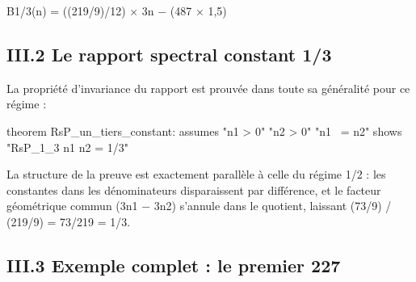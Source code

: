 \documentclass[11pt,a4paper]{article}
\begin{document}
B1/3(n) = ((219/9)/12) × 3n − (487 × 1,5)

\subsection{III.2 Le rapport spectral constant 1/3}

La propriété d'invariance du rapport est prouvée dans toute sa généralité pour ce régime :

\begin{holcode}[title={Code HOL — Théorème RsP = 1/3}]
theorem RsP_un_tiers_constant:
 assumes "n1 > 0" "n2 > 0" "n1 ~= n2"
 shows "RsP_1_3 n1 n2 = 1/3"
\end{holcode}

La structure de la preuve est exactement parallèle à celle du régime 1/2 : les constantes dans les dénominateurs disparaissent par différence, et le facteur géométrique commun (3n1 − 3n2) s'annule dans le quotient, laissant (73/9) / (219/9) = 73/219 = 1/3.

\subsection{III.3 Exemple complet : le premier 227}
\end{document}
